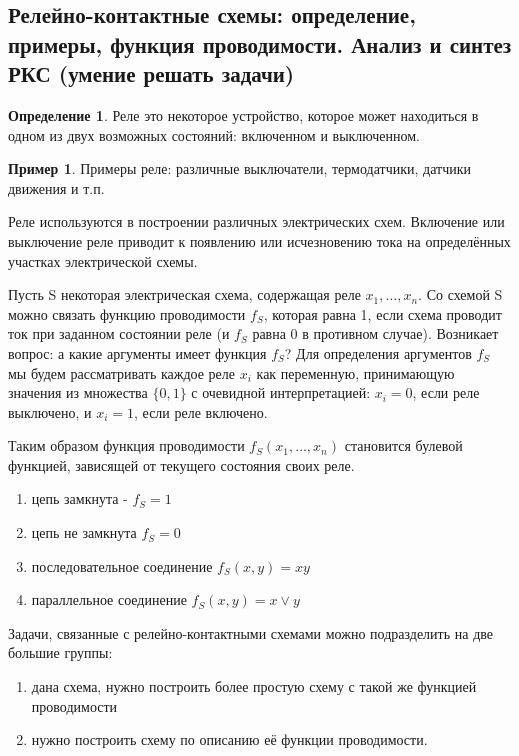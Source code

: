 \documentclass[a4paper]{article}
\theoremstyle{definition}
\newtheorem*{example}{Пример}
\newtheorem*{definition}{Определение}
\theoremstyle{remark}
\begin{document}
    \subsection{Релейно-контактные схемы: определение, примеры, функция проводимости. Анализ и синтез РКС (умение решать задачи)}
    \begin{definition}
        Реле это некоторое устройство, которое может находиться в одном из двух возможных состояний: включенном и выключенном. 
    \end{definition}
    \begin{example}
        Примеры реле: различные выключатели, термодатчики, датчики движения и т.п. 
    \end{example}

    Реле используются в построении различных электрических схем. 
    Включение или выключение реле приводит к появлению 
    или исчезновению тока на определённых участках электрической схемы. 
    


    Пусть S некоторая электрическая схема, содержащая реле $x_1, \dots , x_n$. Со схемой
    S можно связать функцию проводимости $f_S$, которая равна 1, если схема проводит
    ток при заданном состоянии реле (и $f_S$ равна 0 в противном случае). Возникает
    вопрос: а какие аргументы имеет функция $f_S$? Для определения аргументов $f_S$ мы
    будем рассматривать каждое реле $x_i$ как переменную, принимающую значения из
    множества $\{0, 1\}$ с очевидной интерпретацией: $x_i = 0$, если реле выключено, и $x_i = 1$,
    если реле включено.

    Таким образом функция проводимости $f_S(x_1, \dots , x_n)$ становится булевой функцией, 
    зависящей от текущего состояния своих реле.

    \begin{enumerate}
        \item цепь замкнута - $f_S = 1$
        \item цепь не замкнута $f_S = 0$
        \item последовательное соединение $f_S(x, y) = xy$
        \item параллельное соединение $f_S(x, y) = x\vee y$
    \end{enumerate}
    Задачи, связанные с релейно-контактными схемами можно подразделить на две
большие группы:
\begin{enumerate}
    \item дана схема, нужно построить более простую схему с такой же функцией проводимости
    \item нужно построить схему по описанию её функции проводимости.
\end{enumerate}
\end{document}

